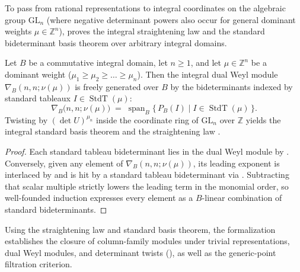 To pass from rational representations to integral coordinates on the algebraic
group $\mathrm{GL}_n$ (where negative determinant powers also occur for general
dominant weights $\mu \in \mathbb{Z}^n$),
 proves the integral
straightening law and the standard bideterminant basis theorem over arbitrary
integral domains.

\begin{theorem}
\label{thm:ch02-standard-basis}
Let $B$ be a commutative integral domain, let $n \ge 1$, and let
$\mu \in \mathbb{Z}^n$ be a dominant weight ($\mu_1 \ge \mu_2 \ge \dots \ge \mu_n$).
Then the integral dual Weyl module $\nabla_B(n, n; \nu(\mu))$ is freely
generated over $B$ by the bideterminants indexed by standard tableaux
$I \in \operatorname{StdT}(\mu)$:
\[
  \nabla_B\bigl(n, n; \nu(\mu)\bigr)
  \;=\;
  \operatorname{span}_B\!\bigl\{\, P_B(I) \;\big|\; I \in \operatorname{StdT}(\mu) \,\bigr\}.
\]
Twisting by $(\det U)^{\mu_n}$ inside the coordinate ring of $\mathrm{GL}_n$
over $\mathbb{Z}$ yields the integral standard basis theorem
and the straightening law
.
\end{theorem}

\begin{proof}
Each standard tableau bideterminant lies in the dual Weyl module by
.
Conversely, given any element of $\nabla_B(n, n; \nu(\mu))$, its leading
exponent is interlaced by 
and is hit by a standard tableau bideterminant via
.
Subtracting that scalar multiple strictly lowers the leading term in the
monomial order, so well-founded induction expresses every element as a
$B$-linear combination of standard bideterminants.
\end{proof}

Using the straightening law and standard basis theorem, the formalization
establishes the closure of column-family modules under trivial representations,
dual Weyl modules, and determinant twists
(),
as well as the generic-point filtration criterion.

